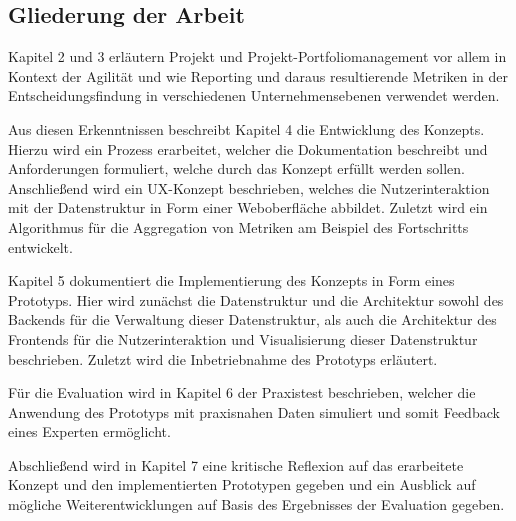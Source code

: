 \subsection{Gliederung der Arbeit}
Kapitel 2 und 3 erläutern Projekt und Projekt-Portfoliomanagement vor allem in Kontext der Agilität und wie Reporting und daraus resultierende Metriken in der Entscheidungsfindung in verschiedenen Unternehmensebenen verwendet werden.

Aus diesen Erkenntnissen beschreibt Kapitel 4 die Entwicklung des Konzepts. Hierzu wird ein Prozess erarbeitet, welcher die Dokumentation beschreibt und Anforderungen formuliert, welche durch das Konzept erfüllt werden sollen. Anschließend wird ein UX-Konzept beschrieben, welches die Nutzerinteraktion mit der Datenstruktur in Form einer Weboberfläche abbildet. Zuletzt wird ein Algorithmus für die Aggregation von Metriken am Beispiel des Fortschritts entwickelt.

Kapitel 5 dokumentiert die Implementierung des Konzepts in Form eines Prototyps. Hier wird zunächst die Datenstruktur und die Architektur sowohl des Backends für die Verwaltung dieser Datenstruktur, als auch die Architektur des Frontends für die Nutzerinteraktion und Visualisierung dieser Datenstruktur beschrieben.
Zuletzt wird die Inbetriebnahme des Prototyps erläutert.

Für die Evaluation wird in Kapitel 6 der Praxistest beschrieben, welcher die Anwendung des Prototyps mit praxisnahen Daten simuliert und somit Feedback eines Experten ermöglicht.

Abschließend wird in Kapitel 7 eine kritische Reflexion auf das erarbeitete Konzept und den implementierten Prototypen gegeben und ein Ausblick auf mögliche Weiterentwicklungen auf Basis des Ergebnisses der Evaluation gegeben.
